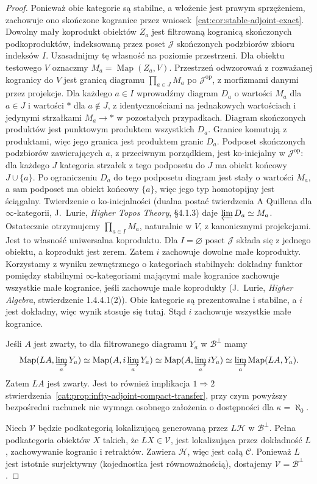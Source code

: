 \begin{proof}
Ponieważ obie kategorie są stabilne, a włożenie jest prawym sprzężeniem, zachowuje ono skończone kogranice przez wniosek~\ref{cat:cor:stable-adjoint-exact}. Dowolny mały koprodukt obiektów $Z_a$ jest filtrowaną kogranicą skończonych podkoproduktów, indeksowaną przez poset $\mathcal J$ skończonych podzbiorów zbioru indeksów $I$. Uzasadnijmy tę własność na poziomie przestrzeni. Dla obiektu testowego $V$ oznaczmy $M_a=\operatorname{Map}(Z_a,V)$. Przestrzeń odwzorowań z rozważanej kogranicy do $V$ jest granicą diagramu $\prod_{a\in J}M_a$ po $\mathcal J^{\mathrm{op}}$, z morfizmami danymi przez projekcje. Dla każdego $a\in I$ wprowadźmy diagram $D_a$ o wartości $M_a$ dla $a\in J$ i wartości $*$ dla $a\notin J$, z identycznościami na jednakowych wartościach i jedynymi strzałkami $M_a\to *$ w pozostałych przypadkach. Diagram skończonych produktów jest punktowym produktem wszystkich $D_a$. Granice komutują z produktami, więc jego granica jest produktem granic $D_a$. Podposet skończonych podzbiorów zawierających $a$, z przeciwnym porządkiem, jest ko-inicjalny w $\mathcal J^{\mathrm{op}}$: dla każdego $J$ kategoria strzałek z tego podposetu do $J$ ma obiekt końcowy $J\cup\{a\}$. Po ograniczeniu $D_a$ do tego podposetu diagram jest stały o wartości $M_a$, a sam podposet ma obiekt końcowy $\{a\}$, więc jego typ homotopijny jest ściągalny. Twierdzenie o ko-inicjalności (dualna postać twierdzenia A Quillena dla $\infty$-kategorii, J.~Lurie, \emph{Higher Topos Theory}, \S4.1.3) daje $\varprojlim D_a\simeq M_a$. Ostatecznie otrzymujemy $\prod_{a\in I} M_a$, naturalnie w $V$, z kanonicznymi projekcjami. Jest to własność uniwersalna koproduktu. Dla $I=\varnothing$ poset $\mathcal J$ składa się z jednego obiektu, a koprodukt jest zerem. Zatem $i$ zachowuje dowolne małe koprodukty. Korzystamy z wyniku zewnętrznego o kategoriach stabilnych: dokładny funktor pomiędzy stabilnymi $\infty$-kategoriami mającymi małe kogranice zachowuje wszystkie małe kogranice, jeśli zachowuje małe koprodukty (J.~Lurie, \emph{Higher Algebra}, stwierdzenie 1.4.4.1(2)). Obie kategorie są prezentowalne i stabilne, a $i$ jest dokładny, więc wynik stosuje się tutaj. Stąd $i$ zachowuje wszystkie małe kogranice.

Jeśli $A$ jest zwarty, to dla filtrowanego diagramu $Y_a$ w $\mathcal B^\perp$ mamy
\[
 \operatorname{Map}(LA,\varinjlim_aY_a)
 \simeq\operatorname{Map}(A,i\varinjlim_aY_a)
 \simeq\operatorname{Map}(A,\varinjlim_aiY_a)
 \simeq\varinjlim_a\operatorname{Map}(LA,Y_a).
\]
Zatem $LA$ jest zwarty. Jest to również implikacja $1\Rightarrow2$ stwierdzenia~\ref{cat:prop:infty-adjoint-compact-transfer}, przy czym powyższy bezpośredni rachunek nie wymaga osobnego założenia o dostępności dla $\kappa=\aleph_0$.

Niech $\mathcal V$ będzie podkategorią lokalizującą generowaną przez $L\mathcal H$ w $\mathcal B^\perp$. Pełna podkategoria obiektów $X$ takich, że $LX\in\mathcal V$, jest lokalizująca przez dokładność $L$, zachowywanie kogranic i retraktów. Zawiera $\mathcal H$, więc jest całą $\mathcal C$. Ponieważ $L$ jest istotnie surjektywny (kojednostka jest równoważnością), dostajemy $\mathcal V=\mathcal B^\perp$.
\end{proof}

